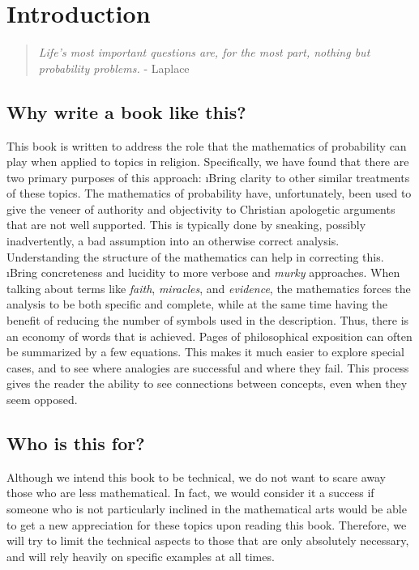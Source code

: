 \chapter{Introduction}\label{ch:intro}

\begin{quote}
{\em Life's most important questions are, for the most part, nothing but probability problems.} - Laplace
\end{quote}

\section{Why write a book like this?}

This book is written to address the role that the mathematics of probability can play when applied to topics in religion.  Specifically, we have found that there are two primary purposes of this approach:
\be
\i Bring clarity to other similar treatments of these topics.  The mathematics of probability have, unfortunately, been used to give the veneer of authority and objectivity to Christian apologetic arguments that are not well supported\cite{swinburne2003resurrection}.  This is typically done by sneaking, possibly inadvertently, a bad assumption into an otherwise correct analysis.  Understanding the structure of the mathematics can help in correcting this.
\i Bring concreteness and lucidity to more verbose and {\em murky} approaches.  When talking about terms like {\em faith}, {\em miracles}, and {\em evidence}, the mathematics forces the analysis to be both specific and complete, while at the same time having the benefit of reducing the number of symbols used in the description.  Thus, there is an economy of words that is achieved.  Pages of philosophical exposition can often be summarized by a few equations\cite{howard2013propositional}.  This makes it much easier to explore special cases, and to see where analogies are successful and where they fail.  This process gives the reader the ability to see connections between concepts, even when they seem opposed.
\ee

\section{Who is this for?}

Although we intend this book to be technical, we do not want to scare away those who are less mathematical.  In fact, we would consider it a success if someone who is not particularly inclined in the mathematical arts would be able to get a new appreciation for these topics upon reading this book.  Therefore, we will try to limit the technical aspects to those that are only absolutely necessary, and will rely heavily on specific examples at all times.

